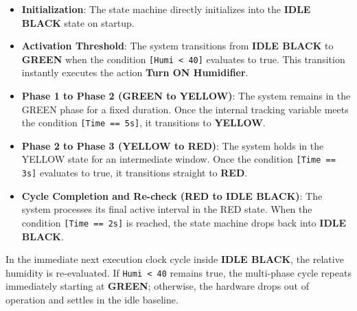 \begin{itemize}
  \item \textbf{Initialization}: The state machine directly initializes into the \textbf{IDLE BLACK} state on startup.
  \item \textbf{Activation Threshold}: The system transitions from \textbf{IDLE BLACK} to \textbf{GREEN} when the
        condition \texttt{[Humi \textless{} 40]} evaluates to true. This transition instantly executes the action
        \textbf{Turn ON Humidifier}.
  \item \textbf{Phase 1 to Phase 2 (GREEN to YELLOW)}: The system remains in the GREEN phase for a fixed duration. Once
        the internal tracking variable meets the condition \texttt{[Time == 5s]}, it transitions to \textbf{YELLOW}.
  \item \textbf{Phase 2 to Phase 3 (YELLOW to RED)}: The system holds in the YELLOW state for an intermediate window.
        Once the condition \texttt{[Time == 3s]} evaluates to true, it transitions straight to \textbf{RED}.
  \item \textbf{Cycle Completion and Re-check (RED to IDLE BLACK)}: The system processes its final active interval in
        the RED state. When the condition \texttt{[Time == 2s]} is reached, the state machine drops back into
        \textbf{IDLE BLACK}.
\end{itemize}

In the immediate next execution clock cycle inside \textbf{IDLE BLACK}, the relative humidity is re-evaluated. If
\texttt{Humi < 40} remains true, the multi-phase cycle repeats immediately starting at \textbf{GREEN}; otherwise, the
hardware drops out of operation and settles in the idle baseline.
